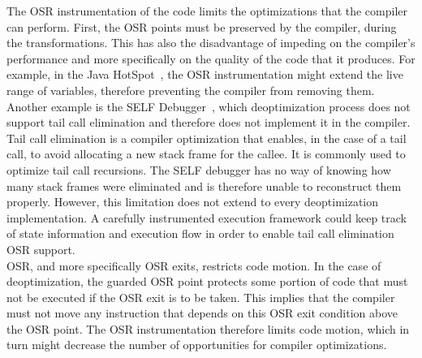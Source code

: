 The OSR instrumentation of the code limits the optimizations that the compiler can perform.
First, the OSR points must be preserved by the compiler, during the transformations.
This has also the disadvantage of impeding on the compiler's performance and more specifically on the quality of the code that it produces.
For example, in the Java HotSpot~\cite{paleczny2001java}, the OSR instrumentation might extend the live range of variables, therefore preventing the compiler from removing them.
Another example is the SELF Debugger~\cite{holzle1992debugging}, which deoptimization process does not support tail call elimination and therefore does not implement it in the compiler.
Tail call elimination is a compiler optimization that enables, in the case of a tail call, to avoid allocating a new stack frame for the callee. 
It is commonly used to optimize tail call recursions.
The SELF debugger has no way of knowing how many stack frames were eliminated and is therefore unable to reconstruct them properly.
However, this limitation does not extend to every deoptimization implementation.
A carefully instrumented execution framework could keep track of state information and execution flow in order to enable tail call elimination OSR support.\\

OSR, and more specifically OSR exits, restricts code motion. 
In the case of deoptimization, the guarded OSR point protects some portion of code that must not be executed if the OSR exit is to be taken.
This implies that the compiler must not move any instruction that depends on this OSR exit condition above the OSR point.
The OSR instrumentation therefore limits code motion, which in turn might decrease the number of opportunities for compiler optimizations.